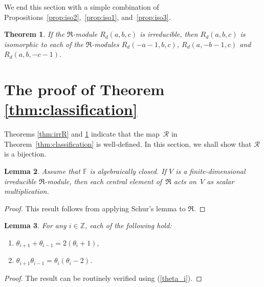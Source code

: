 \documentclass[pdftex]{sigma}
\def\F{\mathbb F}
\def\Z{\mathbb Z}
\numberwithin{equation}{section}
\newtheorem{Theorem}{Theorem}[section]
\newtheorem{Lemma}[Theorem]{Lemma}
\begin{document}
We end this section with a simple combination of Propositions~\ref{prop:iso2},~\ref{prop:iso1}, and~\ref{prop:iso3}.

\begin{Theorem}\label{thm:iso}If the $\Re$-module $R_d(a,b,c)$ is irreducible, then $R_d(a,b,c)$ is isomorphic to each of the $\Re$-modules $R_d(-a-1,b,c)$, $R_d(a,-b-1,c)$ and $R_d(a,b,-c-1)$.
\end{Theorem}

\section{The proof of Theorem \ref{thm:classification}}\label{s:proof}

Theorems \ref{thm:irrR} and \ref{thm:iso} indicate that the map~$\mathcal R$ in Theorem~\ref{thm:classification} is well-defined. In this section, we shall show that $\mathcal R$ is a bijection.

\begin{Lemma}\label{lem:Schur}Assume that $\F$ is algebraically closed. If $V$ is a finite-dimensional irreducible $\Re$-module, then each central element of~$\Re$ acts on~$V$ as scalar multiplication.
\end{Lemma}
\begin{proof}This result follows from applying Schur's lemma to $\Re$.
\end{proof}

\begin{Lemma}\label{lem:theta}For any $i\in \Z$, each of the following hold:
\begin{enumerate}\itemsep=0pt
\item[$(i)$] $\theta_{i+1}+\theta_{i-1}=2(\theta_i+1)$,
\item[$(ii)$] $\theta_{i+1}\theta_{i-1}=\theta_i(\theta_i-2)$.
\end{enumerate}
\end{Lemma}
\begin{proof}The result can be routinely verified using (\ref{theta_i}).
\end{proof}
\end{document}
